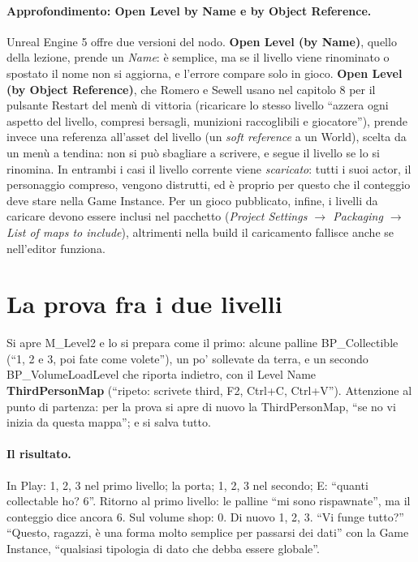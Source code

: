 \paragraph{Approfondimento: Open Level by Name e by Object Reference.} Unreal Engine 5
offre due versioni del nodo. \textbf{Open Level (by Name)}, quello della lezione,
prende un \emph{Name}: è semplice, ma se il livello viene rinominato o spostato il nome
non si aggiorna, e l'errore compare solo in gioco. \textbf{Open Level (by Object
Reference)}, che Romero e Sewell usano nel capitolo 8 per il pulsante Restart del menù
di vittoria (ricaricare lo stesso livello ``azzera ogni aspetto del livello, compresi
bersagli, munizioni raccoglibili e giocatore''), prende invece una referenza all'asset del livello (un \emph{soft
reference} a un World), scelta da un menù a tendina: non si può sbagliare a scrivere, e
segue il livello se lo si rinomina. In entrambi i casi il livello corrente viene
\emph{scaricato}: tutti i suoi actor, il personaggio compreso, vengono distrutti, ed è
proprio per questo che il conteggio deve stare nella Game Instance. Per un gioco
pubblicato, infine, i livelli da caricare devono essere inclusi nel pacchetto
(\emph{Project Settings $\rightarrow$ Packaging $\rightarrow$ List of maps to include}),
altrimenti nella build il caricamento fallisce anche se nell'editor funziona.

\section{La prova fra i due livelli}
\label{ue8:sec:prova}

Si apre M\_Level2 e lo si prepara come il primo: alcune palline BP\_Collectible (``1, 2 e
3, poi fate come volete''), un po' sollevate da terra, e un secondo BP\_VolumeLoadLevel
che riporta indietro, con il Level Name \textbf{ThirdPersonMap} (``ripeto: scrivete
third, F2, Ctrl+C, Ctrl+V''). Attenzione al punto di partenza: per la prova si apre di
nuovo la ThirdPersonMap, ``se no vi inizia da questa mappa''; e si salva tutto.

\paragraph{Il risultato.} In Play: 1, 2, 3 nel primo livello; la porta; 1, 2, 3 nel
secondo; E: ``quanti collectable ho? 6''. Ritorno al primo livello: le palline ``mi sono
rispawnate'', ma il conteggio dice ancora 6. Sul volume shop: 0. Di nuovo 1, 2, 3.
``Vi funge tutto?'' ``Questo, ragazzi, è una forma molto semplice per passarsi dei dati''
con la Game Instance, ``qualsiasi tipologia di dato che debba essere globale''.

